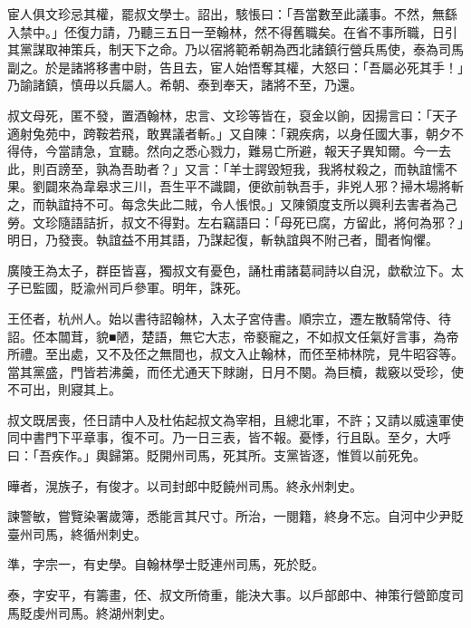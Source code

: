 \begin{pinyinscope}
 宦人俱文珍忌其權，罷叔文學士。詔出，駭悵曰：「吾當數至此議事。不然，無繇入禁中。」伾復力請，乃聽三五日一至翰林，然不得舊職矣。在省不事所職，日引其黨謀取神策兵，制天下之命。乃以宿將範希朝為西北諸鎮行營兵馬使，泰為司馬副之。於是諸將移書中尉，告且去，宦人始悟奪其權，大怒曰：「吾屬必死其手！」乃諭諸鎮，慎毋以兵屬人。希朝、泰到奉天，諸將不至，乃還。



 叔文母死，匿不發，置酒翰林，忠言、文珍等皆在，裒金以餉，因揚言曰：「天子適射兔苑中，跨鞍若飛，敢異議者斬。」又自陳：「親疾病，以身任國大事，朝夕不得侍，今當請急，宜聽。然向之悉心戮力，難易亡所避，報天子異知爾。今一去此，則百謗至，孰為吾助者？」又言：「羊士諤毀短我，我將杖殺之，而執誼懦不果。劉闢來為韋皋求三川，吾生平不識闢，便欲前執吾手，非兇人邪？掃木場將斬之，而執誼持不可。每念失此二賊，令人悵恨。」又陳領度支所以興利去害者為己勞。文珍隨語詰折，叔文不得對。左右竊語曰：「母死已腐，方留此，將何為邪？」明日，乃發喪。執誼益不用其語，乃謀起復，斬執誼與不附己者，聞者恟懼。



 廣陵王為太子，群臣皆喜，獨叔文有憂色，誦杜甫諸葛祠詩以自況，歔欷泣下。太子已監國，貶渝州司戶參軍。明年，誅死。



 王伾者，杭州人。始以書待詔翰林，入太子宮侍書。順宗立，遷左散騎常侍、待詔。伾本闒茸，貌■陋，楚語，無它大志，帝褻寵之，不如叔文任氣好言事，為帝所禮。至出處，又不及伾之無間也，叔文入止翰林，而伾至柿林院，見牛昭容等。當其黨盛，門皆若沸羹，而伾尤通天下賕謝，日月不闋。為巨櫝，裁竅以受珍，使不可出，則寢其上。



 叔文既居喪，伾日請中人及杜佑起叔文為宰相，且總北軍，不許；又請以威遠軍使同中書門下平章事，復不可。乃一日三表，皆不報。憂悸，行且臥。至夕，大呼曰：「吾疾作。」輿歸第。貶開州司馬，死其所。支黨皆逐，惟質以前死免。



 曄者，滉族子，有俊才。以司封郎中貶饒州司馬。終永州刺史。



 諫警敏，嘗覽染署歲簿，悉能言其尺寸。所治，一閱籍，終身不忘。自河中少尹貶臺州司馬，終循州刺史。



 準，字宗一，有史學。自翰林學士貶連州司馬，死於貶。



 泰，字安平，有籌畫，伾、叔文所倚重，能決大事。以戶部郎中、神策行營節度司馬貶虔州司馬。終湖州刺史。




\end{pinyinscope}
